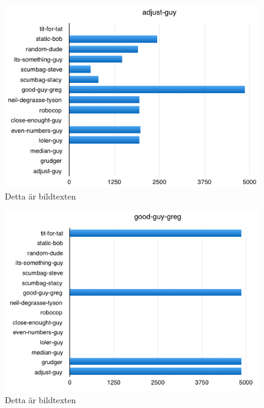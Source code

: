 \begin{figure}[htb]
	\begin{center}
	\includegraphics[scale=0.75, angle=0]{bilder/adjust-guy.png}
	\caption{Detta är bildtexten}
	\label{adjust-guy}
	\end{center}
\end{figure}

\begin{figure}[htb]
	\begin{center}
	\includegraphics[scale=0.75, angle=0]{bilder/good-guy-greg.png}
	\caption{Detta är bildtexten}
	\label{good-guy-greg}
	\end{center}
\end{figure}

